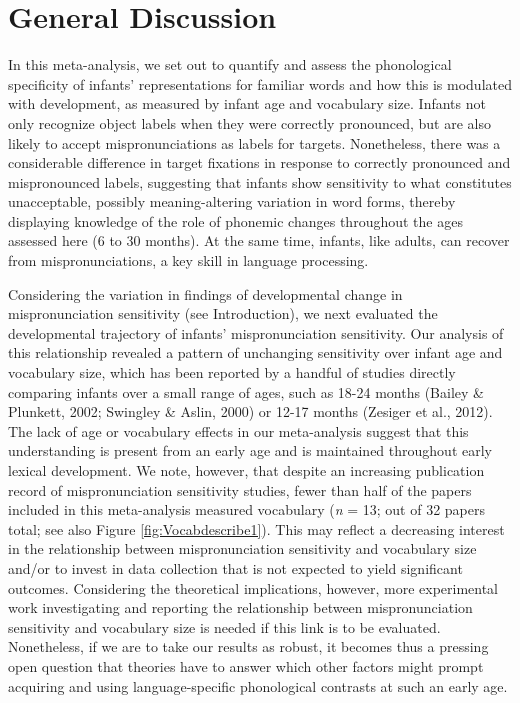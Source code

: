 \documentclass[
  man, noextraspace]{apa6}
\begin{document}
\hypertarget{general-discussion}{%
\section{General Discussion}\label{general-discussion}}

In this meta-analysis, we set out to quantify and assess the phonological specificity of infants' representations for familiar words and how this is modulated with development, as measured by infant age and vocabulary size. Infants not only recognize object labels when they were correctly pronounced, but are also likely to accept mispronunciations as labels for targets. Nonetheless, there was a considerable difference in target fixations in response to correctly pronounced and mispronounced labels, suggesting that infants show sensitivity to what constitutes unacceptable, possibly meaning-altering variation in word forms, thereby displaying knowledge of the role of phonemic changes throughout the ages assessed here (6 to 30 months). At the same time, infants, like adults, can recover from mispronunciations, a key skill in language processing.

Considering the variation in findings of developmental change in mispronunciation sensitivity (see Introduction), we next evaluated the developmental trajectory of infants' mispronunciation sensitivity. Our analysis of this relationship revealed a pattern of unchanging sensitivity over infant age and vocabulary size, which has been reported by a handful of studies directly comparing infants over a small range of ages, such as 18-24 months (Bailey \& Plunkett, 2002; Swingley \& Aslin, 2000) or 12-17 months (Zesiger et al., 2012). The lack of age or vocabulary effects in our meta-analysis suggest that this understanding is present from an early age and is maintained throughout early lexical development. We note, however, that despite an increasing publication record of mispronunciation sensitivity studies, fewer than half of the papers included in this meta-analysis measured vocabulary (\emph{n} = 13; out of 32 papers total; see also Figure \ref{fig:Vocabdescribe1}). This may reflect a decreasing interest in the relationship between mispronunciation sensitivity and vocabulary size and/or to invest in data collection that is not expected to yield significant outcomes. Considering the theoretical implications, however, more experimental work investigating and reporting the relationship between mispronunciation sensitivity and vocabulary size is needed if this link is to be evaluated. Nonetheless, if we are to take our results as robust, it becomes thus a pressing open question that theories have to answer which other factors might prompt acquiring and using language-specific phonological contrasts at such an early age.
\end{document}
